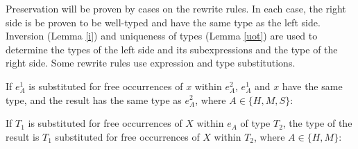 Preservation will be proven by cases on the rewrite rules.  In each case, the right side is be proven to be well-typed and have the same type as the left side.  Inversion (Lemma \ref{i}) and uniqueness of types (Lemma \ref{uot}) are used to determine the types of the left side and its subexpressions and the type of the right side.  Some rewrite rules use expression and type substitutions.

If $e_{A}^{1}$ is substituted for free occurrences of $x$ within $e_{A}^{2}$, $e_{A}^{1}$ and $x$ have the same type, and the result has the same type as $e_{A}^{2}$, where $A\in\lbrace H,M,S\rbrace$:



If $T_{1}$ is substituted for free occurrences of $X$ within $e_{A}$ of type $T_{2}$, the type of the result is $T_{1}$ substituted for free occurrences of $X$ within $T_{2}$, where $A\in\lbrace H,M\rbrace$:



